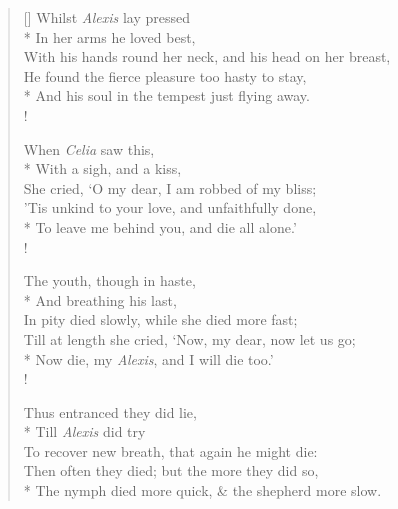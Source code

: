 \documentclass[MAIN]{subfiles}
\begin{document}
\settowidth{\versewidth}{With his hands round her neck, and his head on her breast,}
\begin{verse}[\versewidth]
\vin Whilst \emph{Alexis} lay pressed\\*
\vin In her arms he loved best,\\
With his hands round her neck, and his head on her breast,\\	
He found the fierce pleasure too hasty to stay,\\*
And his soul in the tempest just flying away.\\!

\vin When \emph{Celia} saw this,\\*
\vin With a sigh, and a kiss,\\
She cried, `O my dear, I am robbed of my bliss;\\
’Tis unkind to your love, and unfaithfully done,\\*
To leave me behind you, and die all alone.'\\!

\vin The youth, though in haste,\\*
\vin And breathing his last,\\
In pity died slowly, while she died more fast;\\
Till at length she cried, `Now, my dear, now let us go;\\*
Now die, my \emph{Alexis}, and I will die too.'\\!

\vin Thus entranced they did lie,\\*
\vin Till \emph{Alexis} did try\\
To recover new breath, that again he might die:\\
Then often they died; but the more they did so,\\*
The nymph died more quick, \& the shepherd more slow.
\end{verse}
\end{document}

